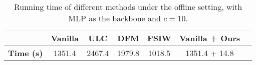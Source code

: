 \begin{table}[htbp]
\caption{Running time of different methods under the offline setting, with MLP as the backbone and $c=10$.}
\begin{tabular}{c|cccccc}
\toprule 
     & 
     {Vanilla} & {ULC}       & {DFM}     & {FSIW}    & {Vanilla + Ours}  \\ \midrule
\textbf{Time (s)} & 1351.4 & 2467.4 & 1979.8 & 1018.5 & 1351.4 + 14.8 \\ \bottomrule
\end{tabular}
\label{time}
\end{table}